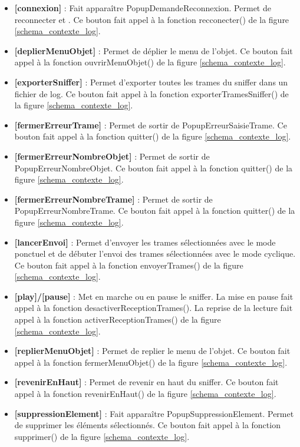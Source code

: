 \begin{itemize}
\begin{itemize}
            \item \textbf{[connexion]} : Fait apparaître PopupDemandeReconnexion. Permet de reconnecter {\nomApplication} et {\nomLogiciel}. Ce bouton fait appel à la fonction recconecter() de la figure \ref{schema_contexte_log}.
            \item \textbf{[deplierMenuObjet]} : Permet de déplier le menu de l'objet. Ce bouton fait appel à la fonction ouvrirMenuObjet() de la figure \ref{schema_contexte_log}. 
            \item \textbf{[exporterSniffer]} : Permet d'exporter toutes les trames du sniffer dans un fichier de log. Ce bouton fait appel à la fonction exporterTramesSniffer() de la figure \ref{schema_contexte_log}.
            \item \textbf{[fermerErreurTrame]} : Permet de sortir de PopupErreurSaisieTrame. Ce bouton fait appel à la fonction quitter() de la figure \ref{schema_contexte_log}.
            \item \textbf{[fermerErreurNombreObjet]} : Permet de sortir de PopupErreurNombreObjet. Ce bouton fait appel à la fonction quitter() de la figure \ref{schema_contexte_log}.
            \item \textbf{[fermerErreurNombreTrame]} : Permet de sortir de PopupErreurNombreTrame. Ce bouton fait appel à la fonction quitter() de la figure \ref{schema_contexte_log}.
            \item \textbf{[lancerEnvoi]} : Permet d'envoyer les trames sélectionnées avec le mode ponctuel et de débuter l'envoi des trames sélectionnées avec le mode cyclique. Ce bouton fait appel à la fonction envoyerTrames() de la figure \ref{schema_contexte_log}.
            \item \textbf{[play]/[pause]} : Met en marche ou en pause le sniffer. La mise en pause fait appel à la fonction desactiverReceptionTrames(). La reprise de la lecture fait appel à la fonction activerReceptionTrames() de la figure \ref{schema_contexte_log}. 
            \item \textbf{[replierMenuObjet]} : Permet de replier le menu de l'objet. Ce bouton fait appel à la fonction fermerMenuObjet() de la figure \ref{schema_contexte_log}.
            \item \textbf{[revenirEnHaut]} : Permet de revenir en haut du sniffer. Ce bouton fait appel à la fonction revenirEnHaut() de la figure \ref{schema_contexte_log}. 
            \item \textbf{[suppressionElement]} : Fait apparaître PopupSuppressionElement. Permet de supprimer les éléments sélectionnés. Ce bouton fait appel à la fonction supprimer() de la figure \ref{schema_contexte_log}. 

\end{itemize}
\end{itemize}
